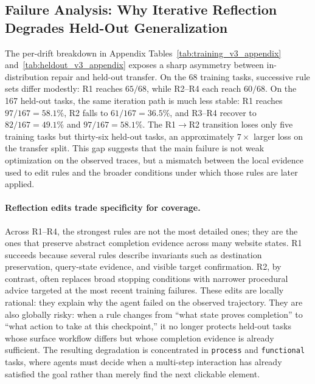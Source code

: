 \subsection{Failure Analysis: Why Iterative Reflection Degrades Held-Out Generalization}
\label{sec:failure_analysis}

The per-drift breakdown in Appendix Tables~\ref{tab:training_v3_appendix} and~\ref{tab:heldout_v3_appendix} exposes a sharp asymmetry between in-distribution repair and held-out transfer. On the 68 training tasks, successive rule sets differ modestly: R1 reaches \(65/68\), while R2--R4 each reach \(60/68\). On the 167 held-out tasks, the same iteration path is much less stable: R1 reaches \(97/167=58.1\%\), R2 falls to \(61/167=36.5\%\), and R3--R4 recover to \(82/167=49.1\%\) and \(97/167=58.1\%\). The R1$\to$R2 transition loses only five training tasks but thirty-six held-out tasks, an approximately \(7{\times}\) larger loss on the transfer split. This gap suggests that the main failure is not weak optimization on the observed traces, but a mismatch between the local evidence used to edit rules and the broader conditions under which those rules are later applied.

\paragraph{Reflection edits trade specificity for coverage.}
Across R1--R4, the strongest rules are not the most detailed ones; they are the ones that preserve abstract completion evidence across many website states. R1 succeeds because several rules describe invariants such as destination preservation, query-state evidence, and visible target confirmation. R2, by contrast, often replaces broad stopping conditions with narrower procedural advice targeted at the most recent training failures. These edits are locally rational: they explain why the agent failed on the observed trajectory. They are also globally risky: when a rule changes from ``what state proves completion'' to ``what action to take at this checkpoint,'' it no longer protects held-out tasks whose surface workflow differs but whose completion evidence is already sufficient. The resulting degradation is concentrated in \texttt{process} and \texttt{functional} tasks, where agents must decide when a multi-step interaction has already satisfied the goal rather than merely find the next clickable element.

